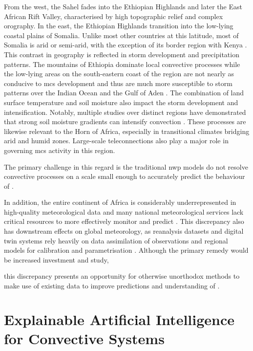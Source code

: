 From the west, the Sahel fades into the Ethiopian Highlands and later the East African Rift Valley, characterised by high topographic relief and complex orography. In the east, the Ethiopian Highlands transition into the low-lying coastal plains of Somalia. Unlike most other countries at this latitude, most of Somalia is arid or semi-arid, with the exception of its border region with Kenya \citep{Beck2023}. This contrast in geography is reflected in storm development and precipitation patterns. The mountains of Ethiopia dominate local convective processes \citep{Negash2024} while the low-lying areas on the south-eastern coast of the region are not nearly as conducive to \acrshort{mcs} development and thus are much more susceptible to storm patterns over the Indian Ocean and the Gulf of Aden \citep{Camberlin2024}. The combination of land surface temperature and soil moisture also impact the storm development and intensification. Notably, multiple studies over distinct regions have demonstrated that strong soil moisture gradients can intensify convection \citep{Barton2021,Klein2020,Taylor2017}. These processes are likewise relevant to the Horn of Africa, especially in transitional climates bridging arid and humid zones. Large-scale \glspl{teleconnection} also play a major role in governing \acrshort{mcs} activity in this region. 

The primary challenge in this regard is the traditional \acrfull{nwp} models do not resolve convective processes on a scale small enough to accurately predict the behaviour of . 

In addition, the entire continent of Africa is considerably underrepresented in high-quality meteorological data and many national meteorological services lack critical resources to more effectively monitor and predict  \citep{Dinku2019,Kinyondo2018,Meque2021}. This discrepancy also has downstream effects on global meteorology, as reanalysis datasets and digital twin systems rely heavily on data assimilation of observations and regional models for calibration and parametrisation \citep{Linsenmeier2023,Valmassoi2023}. Although the primary remedy would be increased investment and study, 

this discrepancy presents an opportunity for otherwise unorthodox methods to make use of existing data to improve predictions and understanding of .

\section{Explainable Artificial Intelligence for Convective Systems}

